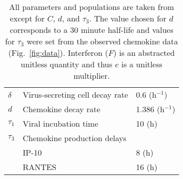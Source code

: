 \documentclass[10pt]{article}
\begin{document}
\begin{table}
\begin{center}
\begin{tabular}{|  l  l  l  |}
  $\delta$ & Virus-secreting cell decay rate & 0.6 (h$^{-1}$) \\
  $d$ & Chemokine decay rate & 1.386 (h$^{-1}$) \\
  $\tau_1$ & Viral incubation time & 10 (h) \\
  $\tau_3$ & Chemokine production delays & \\
    & \hspace{2em} IP-10 & 8 (h)\\
    & \hspace{2em} RANTES & 16 (h)\\
  \hline
\end{tabular}
\caption{All parameters and populations are taken from \cite{Mitchell2011} except for $C$, $d$, and $\tau_3$.  The value chosen for $d$ corresponds to a 30 minute half-life and values for $\tau_3$ were set from the observed chemokine data (Fig.~\ref{fig:data}).  Interferon ($F$) is an abstracted unitless quantity and thus $e$ is a unitless multiplier.}
\label{tab:dde}
\end{center}
\end{table}
\end{document}

